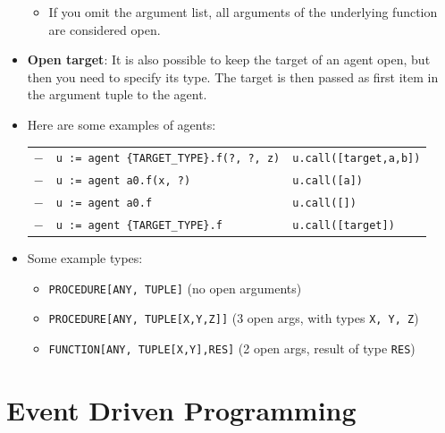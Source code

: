 \documentclass[a4paper]{article}
\newcommand{\inline}[1]{\lstinline!#1!}%
\begin{document}
\begin{itemize}
\begin{itemize}
\item If you omit the argument list, all arguments of the underlying function are considered open.
\end{itemize}
\item \textbf{Open target}: It is also possible to keep the target of an agent open, but then you need to specify its type. The target is then passed as first item in the argument tuple to the agent.
\item Here are some examples of agents:\\
\begin{tabular}{r l|l}
$-$ & \inline{u := agent {TARGET_TYPE}.f(?, ?, z)} & \inline{u.call([target,a,b])}\\
$-$ & \inline{u := agent a0.f(x, ?)} & \inline{u.call([a])}\\
$-$ & \inline{u := agent a0.f} & \inline{u.call([])}\\
$-$ & \inline{u := agent {TARGET_TYPE}.f} & \inline{u.call([target])}\\
\end{tabular}
\item Some example types:
\begin{itemize}
\item \inline{PROCEDURE[ANY, TUPLE]} (no open arguments)
\item \inline{PROCEDURE[ANY, TUPLE[X,Y,Z]]} (3 open args, with types \inline{X, Y, Z})
\item \inline{FUNCTION[ANY, TUPLE[X,Y],RES]} (2 open args, result of type \inline{RES})
\end{itemize}
\end{itemize}

\section{Event Driven Programming}
\end{document}
